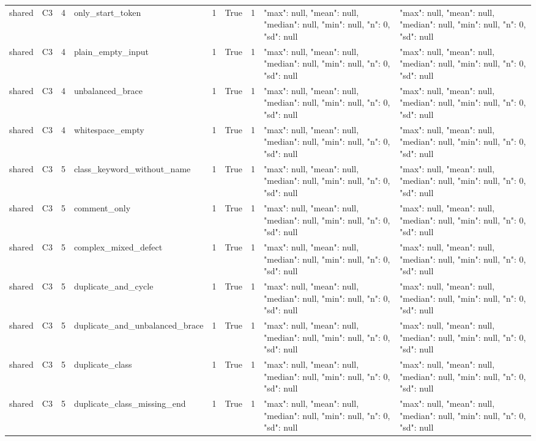 \begin{tabular}{lllllllll}
shared & C3 & 4 & only\_start\_token & 1 & True & 1 & {"max": null, "mean": null, "median": null, "min": null, "n": 0, "sd": null} & {"max": null, "mean": null, "median": null, "min": null, "n": 0, "sd": null} \\
shared & C3 & 4 & plain\_empty\_input & 1 & True & 1 & {"max": null, "mean": null, "median": null, "min": null, "n": 0, "sd": null} & {"max": null, "mean": null, "median": null, "min": null, "n": 0, "sd": null} \\
shared & C3 & 4 & unbalanced\_brace & 1 & True & 1 & {"max": null, "mean": null, "median": null, "min": null, "n": 0, "sd": null} & {"max": null, "mean": null, "median": null, "min": null, "n": 0, "sd": null} \\
shared & C3 & 4 & whitespace\_empty & 1 & True & 1 & {"max": null, "mean": null, "median": null, "min": null, "n": 0, "sd": null} & {"max": null, "mean": null, "median": null, "min": null, "n": 0, "sd": null} \\
shared & C3 & 5 & class\_keyword\_without\_name & 1 & True & 1 & {"max": null, "mean": null, "median": null, "min": null, "n": 0, "sd": null} & {"max": null, "mean": null, "median": null, "min": null, "n": 0, "sd": null} \\
shared & C3 & 5 & comment\_only & 1 & True & 1 & {"max": null, "mean": null, "median": null, "min": null, "n": 0, "sd": null} & {"max": null, "mean": null, "median": null, "min": null, "n": 0, "sd": null} \\
shared & C3 & 5 & complex\_mixed\_defect & 1 & True & 1 & {"max": null, "mean": null, "median": null, "min": null, "n": 0, "sd": null} & {"max": null, "mean": null, "median": null, "min": null, "n": 0, "sd": null} \\
shared & C3 & 5 & duplicate\_and\_cycle & 1 & True & 1 & {"max": null, "mean": null, "median": null, "min": null, "n": 0, "sd": null} & {"max": null, "mean": null, "median": null, "min": null, "n": 0, "sd": null} \\
shared & C3 & 5 & duplicate\_and\_unbalanced\_brace & 1 & True & 1 & {"max": null, "mean": null, "median": null, "min": null, "n": 0, "sd": null} & {"max": null, "mean": null, "median": null, "min": null, "n": 0, "sd": null} \\
shared & C3 & 5 & duplicate\_class & 1 & True & 1 & {"max": null, "mean": null, "median": null, "min": null, "n": 0, "sd": null} & {"max": null, "mean": null, "median": null, "min": null, "n": 0, "sd": null} \\
shared & C3 & 5 & duplicate\_class\_missing\_end & 1 & True & 1 & {"max": null, "mean": null, "median": null, "min": null, "n": 0, "sd": null} & {"max": null, "mean": null, "median": null, "min": null, "n": 0, "sd": null} \\

\end{tabular}

